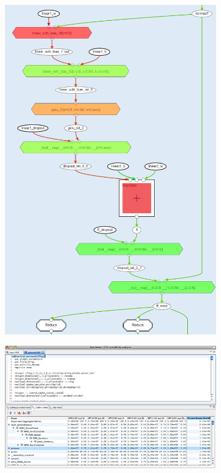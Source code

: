 \begin{figure}
	\begin{subfigure}[c]{.30\textwidth}
		\centering
		\includegraphics[width=\linewidth]{pictures/boosting_master_both.png}
	\end{subfigure}
	\begin{subfigure}[c]{.68\textwidth}
		\centering
		\includegraphics[width=\linewidth]{pictures/hpctoolkitviewer.png}

\end{subfigure}
\end{figure}
